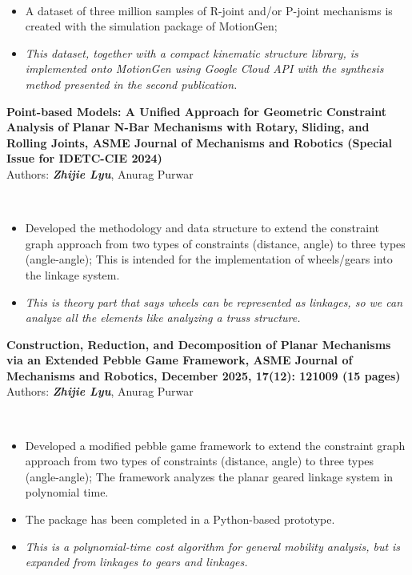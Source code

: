 \documentclass[letterpaper,10pt]{article}
\begin{document}
\begin{itemize}[leftmargin=0.15in, label={}]
{{        {\\ \small{\begin{itemize}
        \item A dataset of three million samples of R-joint and/or P-joint mechanisms is created with the simulation package of MotionGen; 
        \item \emph{This dataset, together with a compact kinematic structure library, is implemented onto MotionGen using Google Cloud API with the synthesis method presented in the second publication. }
    \end{itemize}}}
    }
    \item{\textbf{Point-based Models: A Unified Approach for Geometric Constraint Analysis of Planar N-Bar Mechanisms with Rotary, Sliding, and Rolling Joints, ASME Journal of Mechanisms and Robotics (Special Issue for IDETC-CIE 2024)}{\\ Authors: \textbf{\emph{Zhijie Lyu}}, Anurag Purwar}
        {\\ \small{
        \begin{itemize}
        \item Developed the methodology and data structure to extend the constraint graph approach from two types of constraints (distance, angle) to three types (angle-angle); This is intended for the implementation of wheels/gears into the linkage system. 
        \item \emph{This is theory part that says wheels can be represented as linkages, so we can analyze all the elements like analyzing a truss structure. }
        \end{itemize}
        }}
    }
    \item{\textbf{Construction, Reduction, and Decomposition of Planar Mechanisms via an Extended Pebble Game Framework, ASME Journal of Mechanisms and Robotics, December 2025, 17(12): 121009 (15 pages) } {\\Authors: \textbf{\emph{Zhijie Lyu}}, Anurag Purwar}
        {\\ \small{\begin{itemize}
        \item Developed a modified pebble game framework to extend the constraint graph approach from two types of constraints (distance, angle) to three types (angle-angle); The framework analyzes the planar geared linkage system in polynomial time. 
        \item The package has been completed in a Python-based prototype. 
        \item \emph{This is a polynomial-time cost algorithm for general mobility analysis, but is expanded from linkages to gears and linkages. }

\end{itemize}}}}}
\end{itemize}
\end{document}
